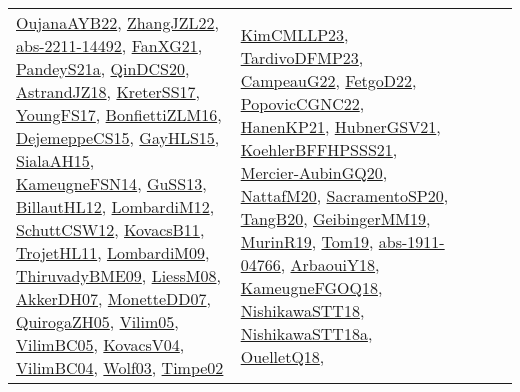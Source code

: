 {\begin{longtable}{lp{3cm}>{\raggedright}p{6cm}>{\raggedright}p{6cm}p{8cm}}
\href{papers/OujanaAYB22.pdf}{OujanaAYB22}\cite{OujanaAYB22}, \href{papers/ZhangJZL22.pdf}{ZhangJZL22}\cite{ZhangJZL22}, \href{articles/abs-2211-14492.pdf}{abs-2211-14492}\cite{abs-2211-14492}, \href{articles/FanXG21.pdf}{FanXG21}\cite{FanXG21}, \href{articles/PandeyS21a.pdf}{PandeyS21a}\cite{PandeyS21a}, \href{articles/QinDCS20.pdf}{QinDCS20}\cite{QinDCS20}, \href{papers/AstrandJZ18.pdf}{AstrandJZ18}\cite{AstrandJZ18}, \href{articles/KreterSS17.pdf}{KreterSS17}\cite{KreterSS17}, \href{papers/YoungFS17.pdf}{YoungFS17}\cite{YoungFS17}, \href{papers/BonfiettiZLM16.pdf}{BonfiettiZLM16}\cite{BonfiettiZLM16}, \href{papers/DejemeppeCS15.pdf}{DejemeppeCS15}\cite{DejemeppeCS15}, \href{papers/GayHLS15.pdf}{GayHLS15}\cite{GayHLS15}, \href{papers/SialaAH15.pdf}{SialaAH15}\cite{SialaAH15}, \href{articles/KameugneFSN14.pdf}{KameugneFSN14}\cite{KameugneFSN14}, \href{papers/GuSS13.pdf}{GuSS13}\cite{GuSS13}, \href{papers/BillautHL12.pdf}{BillautHL12}\cite{BillautHL12}, \href{articles/LombardiM12.pdf}{LombardiM12}\cite{LombardiM12}, \href{papers/SchuttCSW12.pdf}{SchuttCSW12}\cite{SchuttCSW12}, \href{articles/KovacsB11.pdf}{KovacsB11}\cite{KovacsB11}, \href{articles/TrojetHL11.pdf}{TrojetHL11}\cite{TrojetHL11}, \href{papers/LombardiM09.pdf}{LombardiM09}\cite{LombardiM09}, \href{papers/ThiruvadyBME09.pdf}{ThiruvadyBME09}\cite{ThiruvadyBME09}, \href{articles/LiessM08.pdf}{LiessM08}\cite{LiessM08}, \href{papers/AkkerDH07.pdf}{AkkerDH07}\cite{AkkerDH07}, \href{papers/MonetteDD07.pdf}{MonetteDD07}\cite{MonetteDD07}, \href{papers/QuirogaZH05.pdf}{QuirogaZH05}\cite{QuirogaZH05}, \href{papers/Vilim05.pdf}{Vilim05}\cite{Vilim05}, \href{articles/VilimBC05.pdf}{VilimBC05}\cite{VilimBC05}, \href{papers/KovacsV04.pdf}{KovacsV04}\cite{KovacsV04}, \href{papers/VilimBC04.pdf}{VilimBC04}\cite{VilimBC04}, \href{papers/Wolf03.pdf}{Wolf03}\cite{Wolf03}, \href{articles/Timpe02.pdf}{Timpe02}\cite{Timpe02} & \href{papers/KimCMLLP23.pdf}{KimCMLLP23}\cite{KimCMLLP23}, \href{papers/TardivoDFMP23.pdf}{TardivoDFMP23}\cite{TardivoDFMP23}, \href{articles/CampeauG22.pdf}{CampeauG22}\cite{CampeauG22}, \href{articles/FetgoD22.pdf}{FetgoD22}\cite{FetgoD22}, \href{papers/PopovicCGNC22.pdf}{PopovicCGNC22}\cite{PopovicCGNC22}, \href{papers/HanenKP21.pdf}{HanenKP21}\cite{HanenKP21}, \href{articles/HubnerGSV21.pdf}{HubnerGSV21}\cite{HubnerGSV21}, \href{articles/KoehlerBFFHPSSS21.pdf}{KoehlerBFFHPSSS21}\cite{KoehlerBFFHPSSS21}, \href{papers/Mercier-AubinGQ20.pdf}{Mercier-AubinGQ20}\cite{Mercier-AubinGQ20}, \href{papers/NattafM20.pdf}{NattafM20}\cite{NattafM20}, \href{articles/SacramentoSP20.pdf}{SacramentoSP20}\cite{SacramentoSP20}, \href{papers/TangB20.pdf}{TangB20}\cite{TangB20}, \href{papers/GeibingerMM19.pdf}{GeibingerMM19}\cite{GeibingerMM19}, \href{papers/MurinR19.pdf}{MurinR19}\cite{MurinR19}, \href{papers/Tom19.pdf}{Tom19}\cite{Tom19}, \href{articles/abs-1911-04766.pdf}{abs-1911-04766}\cite{abs-1911-04766}, \href{papers/ArbaouiY18.pdf}{ArbaouiY18}\cite{ArbaouiY18}, \href{papers/KameugneFGOQ18.pdf}{KameugneFGOQ18}\cite{KameugneFGOQ18}, \href{papers/NishikawaSTT18.pdf}{NishikawaSTT18}\cite{NishikawaSTT18}, \href{papers/NishikawaSTT18a.pdf}{NishikawaSTT18a}\cite{NishikawaSTT18a}, \href{papers/OuelletQ18.pdf}{OuelletQ18}\cite{OuelletQ18}, 
\end{longtable}}
